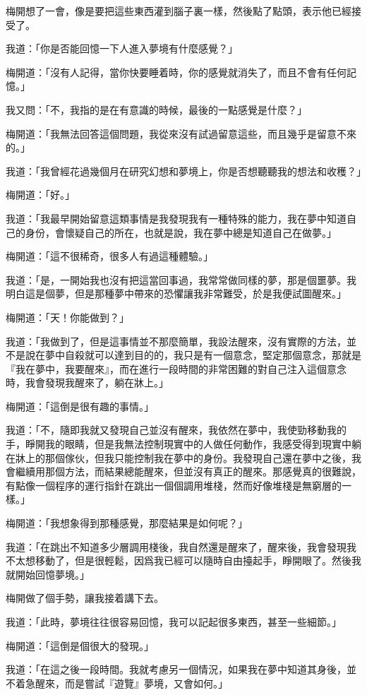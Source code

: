 梅開想了一會，像是要把這些東西灌到腦子裏一樣，然後點了點頭，表示他已經接受了。

我道：「你是否能回憶一下人進入夢境有什麼感覺？」

梅開道：「沒有人記得，當你快要睡着時，你的感覺就消失了，而且不會有任何記憶。」

我又問：「不，我指的是在有意識的時候，最後的一點感覺是什麼？」

梅開道：「我無法回答這個問題，我從來沒有試過留意這些，而且幾乎是留意不來的。」

我道：「我曾經花過幾個月在研究幻想和夢境上，你是否想聽聽我的想法和收穫？」

梅開道：「好。」

我道：「我最早開始留意這類事情是我發現我有一種特殊的能力，我在夢中知道自己的身份，會懷疑自己的所在，也就是說，我在夢中總是知道自己在做夢。」

梅開道：「這不很稀奇，很多人有過這種體驗。」

我道：「是，一開始我也沒有把這當回事過，我常常做同樣的夢，那是個噩夢。我明白這是個夢，但是那種夢中帶來的恐懼讓我非常難受，於是我便試圖醒來。」

梅開道：「天！你能做到？」

我道：「我做到了，但是這事情並不那麼簡單，我設法醒來，沒有實際的方法，並不是說在夢中自殺就可以達到目的的，我只是有一個意念，堅定那個意念，那就是『我在夢中，我要醒來』，而在進行一段時間的非常困難的對自己注入這個意念時，我會發現我醒來了，躺在牀上。」

梅開道：「這倒是很有趣的事情。」

我道：「不，隨即我就又發現自己並沒有醒來，我依然在夢中，我使勁移動我的手，睜開我的眼睛，但是我無法控制現實中的人做任何動作，我感受得到現實中躺在牀上的那個傢伙，但我只能控制我在夢中的身份。我發現自己還在夢中之後，我會繼續用那個方法，而結果總能醒來，但並沒有真正的醒來。那感覺真的很難說，有點像一個程序的運行指針在跳出一個個調用堆棧，然而好像堆棧是無窮層的一樣。」

梅開道：「我想象得到那種感覺，那麼結果是如何呢？」

我道：「在跳出不知道多少層調用棧後，我自然還是醒來了，醒來後，我會發現我不太想移動了，但是很輕鬆，因爲我已經可以隨時自由擡起手，睜開眼了。然後我就開始回憶夢境。」

梅開做了個手勢，讓我接着講下去。

我道：「此時，夢境往往很容易回憶，我可以記起很多東西，甚至一些細節。」

梅開道：「這倒是個很大的發現。」

我道：「在這之後一段時間。我就考慮另一個情況，如果我在夢中知道其身後，並不着急醒來，而是嘗試『遊覽』夢境，又會如何。」

